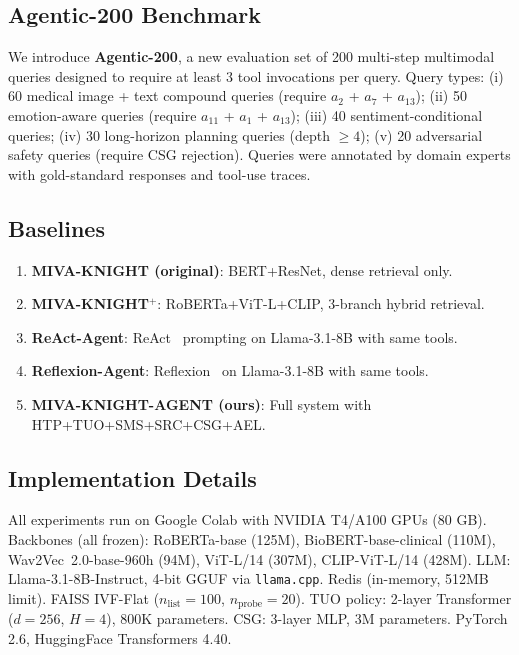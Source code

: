 \documentclass[10pt,conference]{IEEEtran}
\theoremstyle{ieeethm}
\theoremstyle{ieeedef}
\theoremstyle{ieeeremark}
\begin{document}
\subsection{Agentic-200 Benchmark}

We introduce \textbf{Agentic-200}, a new evaluation set of 200 multi-step multimodal queries designed to require at least 3 tool invocations per query. Query types: (i) 60 medical image + text compound queries (require $a_2$ + $a_7$ + $a_{13}$); (ii) 50 emotion-aware queries (require $a_{11}$ + $a_1$ + $a_{13}$); (iii) 40 sentiment-conditional queries; (iv) 30 long-horizon planning queries (depth $\geq 4$); (v) 20 adversarial safety queries (require CSG rejection). Queries were annotated by domain experts with gold-standard responses and tool-use traces.

\subsection{Baselines}

\begin{enumerate}[nosep,label=\textbf{B\arabic*:}]
  \item \textbf{MIVA-KNIGHT (original)}: BERT+ResNet, dense retrieval only.
  \item \textbf{MIVA-KNIGHT$^+$}: RoBERTa+ViT-L+CLIP, 3-branch hybrid retrieval.
  \item \textbf{ReAct-Agent}: ReAct~\cite{yao2023react} prompting on Llama-3.1-8B with same tools.
  \item \textbf{Reflexion-Agent}: Reflexion~\cite{shinn2023reflexion} on Llama-3.1-8B with same tools.
  \item \textbf{MIVA-KNIGHT-AGENT (ours)}: Full system with HTP+TUO+SMS+SRC+CSG+AEL.
\end{enumerate}

\subsection{Implementation Details}

All experiments run on Google Colab with NVIDIA T4/A100 GPUs (80 GB). Backbones (all frozen): RoBERTa-base (125M), BioBERT-base-clinical (110M), Wav2Vec~2.0-base-960h (94M), ViT-L/14 (307M), CLIP-ViT-L/14 (428M). LLM: Llama-3.1-8B-Instruct, 4-bit GGUF via \texttt{llama.cpp}. Redis (in-memory, 512MB limit). FAISS IVF-Flat ($n_\text{list}{=}100$, $n_\text{probe}{=}20$). TUO policy: 2-layer Transformer ($d{=}256$, $H{=}4$), 800K parameters. CSG: 3-layer MLP, 3M parameters. PyTorch 2.6, HuggingFace Transformers 4.40.
\end{document}
